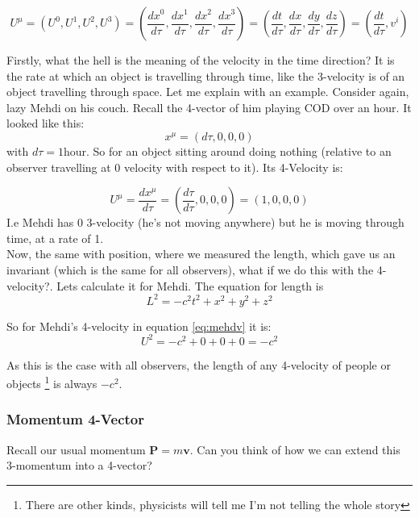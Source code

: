 \begin{equation}
  U^\mu = (U^0, U^1, U^2, U^3) = (\frac{dx^0}{d\tau}, \frac{dx^1}{d\tau},\frac{dx^2}{d\tau},\frac{dx^3}{d\tau}) = (\frac{dt}{d\tau}, \frac{dx}{d\tau},\frac{dy}{d\tau},\frac{dz}{d\tau}) = (\frac{dt}{d\tau}, v^i)
\end{equation}

Firstly, what the hell is the meaning of the velocity in the time direction? It is the rate at which an object is travelling through time, like the 3-velocity is of an object travelling through space. Let me explain with an example. Consider again, lazy Mehdi on his couch. Recall the 4-vector of him playing COD over an hour. It looked like this:
\begin{equation}
  x^\mu = (d\tau, 0,0,0) 
\end{equation}
with $d\tau = 1$hour. So for an object sitting around doing nothing (relative to an observer travelling at 0 velocity with respect to it). Its 4-Velocity is:

\begin{equation}
  U^\mu = \frac{dx^\mu}{d\tau} = (\frac{d\tau}{d\tau}, 0,0,0) = (1,0,0,0)
  \label{eq:mehdv}
\end{equation}
I.e Mehdi has 0 3-velocity (he's not moving anywhere) but he is moving through time, at a rate of 1. \\

Now, the same with position, where we measured the length, which gave us an invariant (which is the same for all observers), what if we do this with the 4-velocity?. Lets calculate it for Mehdi. The equation for length is
\begin{equation}
  L^2 = -c^2 t^2 + x^2 + y^2 + z^2
  \label{eq:4length}
\end{equation}

So for Mehdi's 4-velocity in equation \eqref{eq:mehdv} it is:
\begin{equation}
  U^2 = -c^2 + 0 + 0 +0 = -c^2 
  \label{eq:Ulength}
\end{equation}

As this is the case with all observers, the length of any 4-velocity of people or objects \footnote{There are other kinds, physicists will tell me I'm not telling the whole story} is always $-c^2$. 


\subsubsection{Momentum 4-Vector}
Recall our usual momentum $\mathbf{P} = m \mathbf{v}$. Can you think of how we can extend this 3-momentum into a 4-vector? \\

